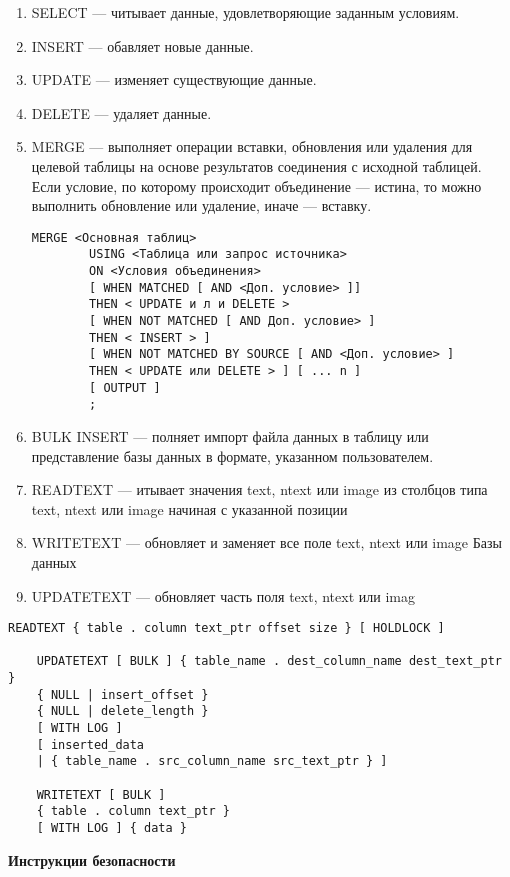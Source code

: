\begin{enumerate}
	\item SELECT — читывает данные, удовлетворяющие заданным условиям.
	\item INSERT — обавляет новые данные.
	\item UPDATE — изменяет существующие данные.
	\item DELETE — удаляет данные.
	\item MERGE — выполняет операции вставки, обновления или удаления для целевой таблицы на основе результатов соединения с исходной таблицей. Если условие, по которому происходит объединение — истина, то можно выполнить обновление или удаление, иначе — вставку.
	
	\begin{lstlisting}[label=updatetext]
		MERGE <Основная таблиц>
		USING <Таблица или запрос источника>
		ON <Условия объединения>
		[ WHEN MATCHED [ AND <Доп. условие> ]]
		THEN < UPDATE и л и DELETE >
		[ WHEN NOT MATCHED [ AND Доп. условие> ]
		THEN < INSERT > ]
		[ WHEN NOT MATCHED BY SOURCE [ AND <Доп. условие> ]
		THEN < UPDATE или DELETE > ] [ ... n ]
		[ OUTPUT ]
		;
	\end{lstlisting}
	
	
	\item BULK INSERT — полняет импорт файла данных в таблицу или представление базы данных в формате, указанном пользователем.
	\item READTEXT — итывает значения text, ntext или image из столбцов типа text, ntext или image начиная
	с указанной позиции
	\item WRITETEXT — обновляет и заменяет все поле text, ntext или image
	Базы данных
	\item UPDATETEXT — обновляет часть поля text, ntext или imag
\end{enumerate}

\begin{lstlisting}[label=updatetext]
	READTEXT { table . column text_ptr offset size } [ HOLDLOCK ]
	
	UPDATETEXT [ BULK ] { table_name . dest_column_name dest_text_ptr }
	{ NULL | insert_offset }
	{ NULL | delete_length }
	[ WITH LOG ]
	[ inserted_data
	| { table_name . src_column_name src_text_ptr } ]
	
	WRITETEXT [ BULK ]
	{ table . column text_ptr }
	[ WITH LOG ] { data }
\end{lstlisting}

\clearpage
\textbf{Инструкции безопасности}

